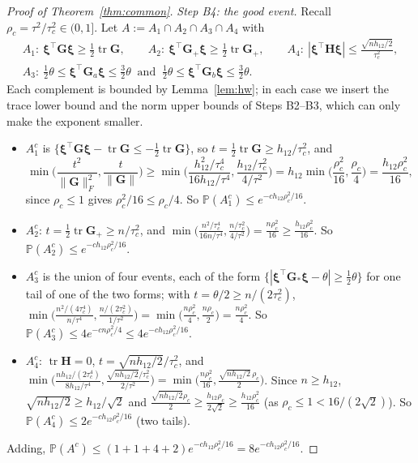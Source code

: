 \documentclass[11pt]{article}
\theoremstyle{definition}
\newcommand{\Prob}{\mathbb{P}}
\newcommand{\tr}{\operatorname{tr}}
\begin{document}
\begin{proof}[Proof of Theorem~\ref{thm:common}]
\emph{Step B4: the good event.} Recall $\rho_c=\tau^2/\tau_c^2\in(0,1]$. Let $A:=A_1\cap A_2\cap A_3\cap A_4$ with
\begin{gather*}
A_1:\ \bm\xi^\top\mathbf G\bm\xi\ge\tfrac12\tr\mathbf G,\qquad A_2:\ \bm\xi^\top\mathbf G_+\bm\xi\ge\tfrac12\tr\mathbf G_+,\qquad A_4:\ |\bm\xi^\top\mathbf H\bm\xi|\le\frac{\sqrt{nh_{12}/2}}{\tau_c^2},\\
A_3:\ \tfrac12\theta\le\bm\xi^\top\mathbf G_a\bm\xi\le\tfrac32\theta\ \text{ and }\ \tfrac12\theta\le\bm\xi^\top\mathbf G_b\bm\xi\le\tfrac32\theta .
\end{gather*}
Each complement is bounded by Lemma~\ref{lem:hw}; in each case we insert the trace lower bound and the norm upper bounds of Steps B2--B3, which can only make the exponent smaller.
\begin{itemize}
\item $A_1^c$ is $\{\bm\xi^\top\mathbf G\bm\xi-\tr\mathbf G\le-\tfrac12\tr\mathbf G\}$, so $t=\tfrac12\tr\mathbf G\ge h_{12}/\tau_c^2$, and
\[
\min\Big(\frac{t^2}{\|\mathbf G\|_F^2},\frac{t}{\|\mathbf G\|}\Big)\ge\min\Big(\frac{h_{12}^2/\tau_c^4}{16h_{12}/\tau^4},\frac{h_{12}/\tau_c^2}{4/\tau^2}\Big)=h_{12}\min\Big(\frac{\rho_c^2}{16},\frac{\rho_c}{4}\Big)=\frac{h_{12}\rho_c^2}{16},
\]
since $\rho_c\le1$ gives $\rho_c^2/16\le\rho_c/4$. So $\Prob(A_1^c)\le e^{-ch_{12}\rho_c^2/16}$.
\item $A_2^c$: $t=\tfrac12\tr\mathbf G_+\ge n/\tau_c^2$, and $\min\Big(\frac{n^2/\tau_c^4}{16n/\tau^4},\frac{n/\tau_c^2}{4/\tau^2}\Big)=\frac{n\rho_c^2}{16}\ge\frac{h_{12}\rho_c^2}{16}$. So $\Prob(A_2^c)\le e^{-ch_{12}\rho_c^2/16}$.
\item $A_3^c$ is the union of four events, each of the form $\{|\bm\xi^\top\mathbf G_\ast\bm\xi-\theta|\ge\tfrac12\theta\}$ for one tail of one of the two forms; with $t=\theta/2\ge n/(2\tau_c^2)$, $\min\Big(\frac{n^2/(4\tau_c^4)}{n/\tau^4},\frac{n/(2\tau_c^2)}{1/\tau^2}\Big)=\min\Big(\frac{n\rho_c^2}{4},\frac{n\rho_c}{2}\Big)=\frac{n\rho_c^2}{4}$. So $\Prob(A_3^c)\le4e^{-cn\rho_c^2/4}\le4e^{-ch_{12}\rho_c^2/16}$.
\item $A_4^c$: $\tr\mathbf H=0$, $t=\sqrt{nh_{12}/2}/\tau_c^2$, and
$\min\Big(\frac{nh_{12}/(2\tau_c^4)}{8h_{12}/\tau^4},\frac{\sqrt{nh_{12}/2}/\tau_c^2}{2/\tau^2}\Big)=\min\Big(\frac{n\rho_c^2}{16},\frac{\sqrt{nh_{12}/2}\,\rho_c}{2}\Big)$. Since $n\ge h_{12}$, $\sqrt{nh_{12}/2}\ge h_{12}/\sqrt2$ and $\frac{\sqrt{nh_{12}/2}\rho_c}{2}\ge\frac{h_{12}\rho_c}{2\sqrt2}\ge\frac{h_{12}\rho_c^2}{16}$ (as $\rho_c\le1<16/(2\sqrt2)$). So $\Prob(A_4^c)\le2e^{-ch_{12}\rho_c^2/16}$ (two tails).
\end{itemize}
Adding, $\Prob(A^c)\le(1+1+4+2)e^{-ch_{12}\rho_c^2/16}=8e^{-ch_{12}\rho_c^2/16}$.


\end{proof}
\end{document}
